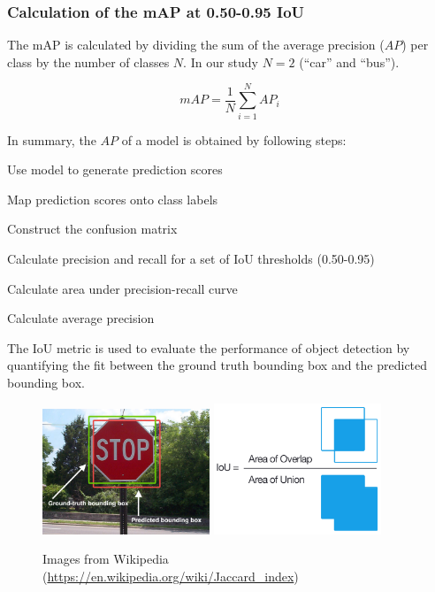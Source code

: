 \documentclass[]{article}
\begin{document}
\subsubsection{Calculation of the mAP at 0.50-0.95 IoU}

	The mAP is calculated by dividing the sum of the average precision ($AP$) per class by the number of classes $N$.  In our study $N = 2$ (``car'' and ``bus'').
	
	\[
	mAP = \frac{1}{N} \sum_{i=1}^{N} AP_i
	\]

	In summary, the $AP$ of a model is obtained by following steps:

	\begin{center}
		\begin{compactenum}
			\item Use model to generate prediction scores
			\item Map prediction scores onto class labels
			\item Construct the confusion matrix
			\item Calculate precision and recall for a set of IoU thresholds (0.50-0.95)
			\item Calculate area under precision-recall curve
			\item Calculate average precision
		\end{compactenum}
	\end{center}

	The IoU metric is used to evaluate the performance of object detection by quantifying the fit between the ground truth bounding box and the predicted bounding box.
	
	\begin{figure}[h]
		\centering
		\includegraphics[width=5cm]{Intersection_over_Union_-_object_detection_bounding_boxes.jpg}
		\includegraphics[width=5cm]{Intersection_over_Union_-_visual_equation.png}
		\caption{Images from Wikipedia \footnotesize{(\url{https://en.wikipedia.org/wiki/Jaccard_index})}}
	\end{figure}
	
\end{document}
